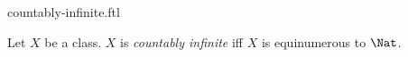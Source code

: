 \documentclass{stex}
\begin{document}
\begin{smodule}{countably-infinite.ftl}


\begin{definition}[forthel,id=CountInfDef]
  Let $X$ be a class.
  $X$ is \emph{countably infinite} iff $X$ is equinumerous to $\Nat$.
\end{definition}

\end{smodule}
\end{document}
